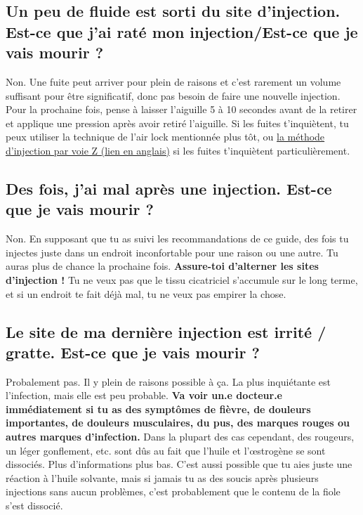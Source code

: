 \documentclass{article}
\begin{document}
\subsection{Un peu de fluide est sorti du site d'injection. Est-ce que j'ai raté mon injection/Est-ce que je vais mourir ?}

Non. Une fuite peut arriver pour plein de raisons et c'est rarement un volume suffisant pour être significatif, donc pas besoin de faire une nouvelle injection. Pour la prochaine fois, pense à laisser l'aiguille 5 à 10 secondes avant de la retirer et applique une pression après avoir retiré l'aiguille. Si les fuites t'inquiètent, tu peux utiliser la technique de l'air lock mentionnée plus tôt, ou \href{https://www.nurse.com/nursing-resources/definitions/what-is-z-track-method/}{la méthode d'injection par voie Z (lien en anglais)} si les fuites t'inquiètent particulièrement.

\subsection{Des fois, j'ai mal après une injection. Est-ce que je vais mourir ?}

Non. En supposant que tu as suivi les recommandations de ce guide, des fois tu injectes juste dans un endroit inconfortable pour une raison ou une autre. Tu auras plus de chance la prochaine fois. \textbf{Assure-toi d'alterner les sites d'injection !} Tu ne veux pas que le tissu cicatriciel s'accumule sur le long terme, et si un endroit te fait déjà mal, tu ne veux pas empirer la chose.

\subsection{Le site de ma dernière injection est irrité / gratte. Est-ce que je vais mourir ?}

Probalement pas. Il y plein de raisons possible à ça. La plus inquiétante est l'infection, mais elle est peu probable. \textbf{Va voir un.e docteur.e immédiatement si tu as des symptômes de fièvre, de douleurs importantes, de douleurs musculaires, du pus, des marques rouges ou autres marques d'infection.} Dans la plupart des cas cependant, des rougeurs, un léger gonflement, etc. sont dûs au fait que l'huile et l'œstrogène se sont dissociés. Plus d'informations plus bas. C'est aussi possible que tu aies juste une réaction à l'huile solvante, mais si jamais tu as des soucis après plusieurs injections sans aucun problèmes, c'est probablement que le contenu de la fiole s'est dissocié.
\end{document}
